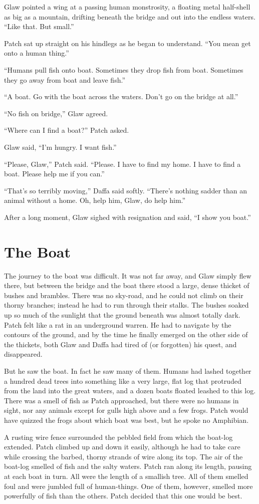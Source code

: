\documentclass[ebook,oneside,openany,17pt]{memoir}
\renewcommand{\thechapter}{\Roman{chapter}}
\newcounter{sections}
\newcommand{\sections}[1]{%
  \section*{#1}
  \addtocounter{sections}{1}%
  \pdfbookmark[1]{#1}{section.\thechapter.\thesections}}
\begin{document}
Glaw pointed a wing at a passing human monstrosity, a floating metal
half-shell as big as a mountain, drifting beneath the bridge and out
into the endless waters. “Like that. But small.”

Patch sat up straight on his hindlegs as he began to understand. “You
mean get onto a human thing.”

“Humans pull fish onto boat. Sometimes they drop fish from
boat. Sometimes they go away from boat and leave fish.”

“A boat. Go with the boat across the waters. Don’t go on the bridge at
all.”

“No fish on bridge,” Glaw agreed.

“Where can I find a boat?” Patch asked.

Glaw said, “I’m hungry. I want fish.”

“Please, Glaw,” Patch said. “Please. I have to find my home. I have to
find a boat. Please help me if you can.”

“That’s so terribly moving,” Daffa said softly. “There’s nothing
sadder than an animal without a home. Oh, help him, Glaw, do help
him.”

After a long moment, Glaw sighed with resignation and said, “I show
you boat.”


\sections{The Boat}

The journey to the boat was difficult. It was not far away, and Glaw
simply flew there, but between the bridge and the boat there stood a
large, dense thicket of bushes and brambles. There was no sky-road,
and he could not climb on their thorny branches; instead he had to run
through their stalks. The bushes soaked up so much of the sunlight
that the ground beneath was almost totally dark. Patch felt like a rat
in an underground warren. He had to navigate by the contours of the
ground, and by the time he finally emerged on the other side of the
thickets, both Glaw and Daffa had tired of (or forgotten) his quest,
and disappeared.

But he saw the boat. In fact he saw many of them. Humans had lashed
together a hundred dead trees into something like a very large, flat
log that protruded from the land into the great waters, and a dozen
boats floated leashed to this log. There was a smell of fish as Patch
approached, but there were no humans in sight, nor any animals except
for gulls high above and a few frogs. Patch would have quizzed the
frogs about which boat was best, but he spoke no Amphibian.

A rusting wire fence surrounded the pebbled field from which the
boat-log extended. Patch climbed up and down it easily, although he
had to take care while crossing the barbed, thorny strands of wire
along its top. The air of the boat-log smelled of fish and the salty
waters. Patch ran along its length, pausing at each boat in turn. All
were the length of a smallish tree. All of them smelled foul and were
jumbled full of human-things. One of them, however, smelled more
powerfully of fish than the others. Patch decided that this one would
be best.
\end{document}
